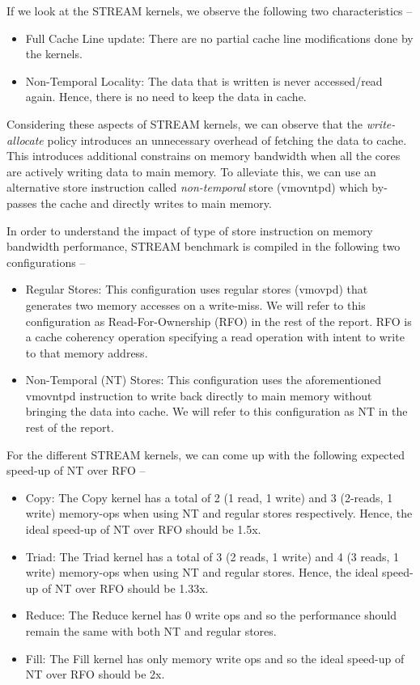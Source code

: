 \documentclass{article}
\begin{document}
If we look at the STREAM kernels, we observe the following two characteristics --
\begin{itemize}
\item Full Cache Line update: There are no partial cache line modifications done by the kernels.
\item Non-Temporal Locality: The data that is written is never accessed/read again. Hence, there is no need to keep the data in cache.
\end{itemize}

Considering these aspects of STREAM kernels, we can observe that the \textit{write-allocate} policy introduces an unnecessary overhead of fetching the data to cache. This introduces additional constrains on memory bandwidth when all the cores are actively writing data to main memory. To alleviate this, we can use an alternative store instruction called \textit{non-temporal} store (vmovntpd) which by-passes the cache and directly writes to main memory.

In order to understand the impact of type of store instruction on memory bandwidth performance, STREAM benchmark is compiled in the following two configurations --
\begin{itemize}
\item Regular Stores: This configuration uses regular stores (vmovpd) that generates two memory accesses on a write-miss. We will refer to this configuration as Read-For-Ownership (RFO) in the rest of the report. RFO is a cache coherency operation specifying a read operation with intent to write to that memory address.
\item Non-Temporal (NT) Stores: This configuration uses the aforementioned vmovntpd instruction to write back directly to main memory without bringing the data into cache. We will refer to this configuration as NT in the rest of the report.
\end{itemize}

For the different STREAM kernels, we can come up with the following expected speed-up of NT over RFO --
\begin{itemize}
\item Copy: The Copy kernel has a total of 2 (1 read, 1 write) and 3 (2-reads, 1 write) memory-ops when using NT and regular stores respectively. Hence, the ideal speed-up of NT over RFO should be 1.5x.
\item Triad: The Triad kernel has a total of 3 (2 reads, 1 write) and 4 (3 reads, 1 write) memory-ops when using NT and regular stores. Hence, the ideal speed-up of NT over RFO should be 1.33x.
\item Reduce: The Reduce kernel has 0 write ops and so the performance should remain the same with both NT and regular stores.
\item Fill: The Fill kernel has only memory write ops and so the ideal speed-up of NT over RFO should be 2x.
\end{itemize}
\end{document}

